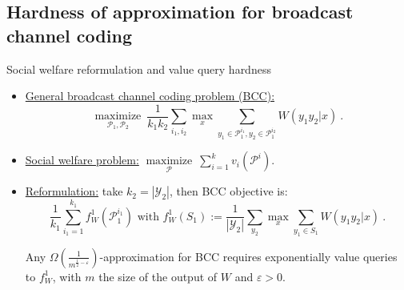 \documentclass{beamer}
\theoremstyle{definition}
\theoremstyle{remark}
\DeclareMathOperator{\maxi}{\text{maximize}}
\begin{document}
\subsection{Hardness of approximation for broadcast channel coding}

\begin{frame}{Social welfare reformulation and value query hardness}
  \begin{itemize}
  \item \underline{General broadcast channel coding problem (\textsc{BCC}):}
    \[ \underset{\mathcal{P}_1,\mathcal{P}_2}{\maxi} \  \frac{1}{k_1k_2}\sum_{i_1,i_2} \max_x \sum_{y_1 \in \mathcal{P}_1^{i_1}, y_2 \in \mathcal{P}_1^{i_2}} W(y_1y_2|x) \ .\]

    \pause
    
  \item \underline{Social welfare problem:} $\underset{\mathcal{P}}{\maxi} \ \sum_{i=1}^k v_i\left(\mathcal{P}^i\right)$.

    \pause

  \item \underline{Reformulation:} take $k_2=|\mathcal{Y}_2|$, then BCC objective is:
    \[ \frac{1}{k_1}\sum_{i_1=1}^{k_1} f_W^1(\mathcal{P}_1^{i_1}) \text{ with } f_W^1(S_1) := \frac{1}{|\mathcal{Y}_2|}\sum_{y_2} \max_x \sum_{y_1 \in S_1} W(y_1y_2|x)\ .\]

    \pause

    \begin{theorem}
      Any $\Omega\left(\frac{1}{m^{\frac{1}{2}-\varepsilon}}\right)$-approximation for BCC requires exponentially value queries to $f_W^1$, with $m$ the size of the output of $W$ and $\varepsilon > 0$.
    \end{theorem}
  \end{itemize}
\end{frame}

%
  
\end{document}
